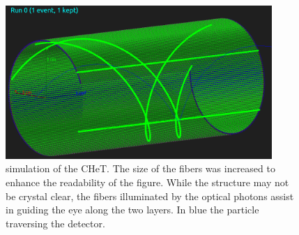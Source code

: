 \begin{refsection}
        \begin{figure}
            \centering
            \includegraphics[width = 0.9\textwidth]{Figures/muEDM/CyFi/CHeT_G4.png}
            \caption[muEDM: CHeT \gf]{\gf simulation of the CHeT. The size of the fibers was increased to enhance the readability of the figure. While the structure may not be crystal clear, the fibers illuminated by the optical photons assist in guiding the eye along the two layers. In blue the particle traversing the detector.}
            \label{fig:CHeT:G4}
        \end{figure}
        

\end{refsection}
